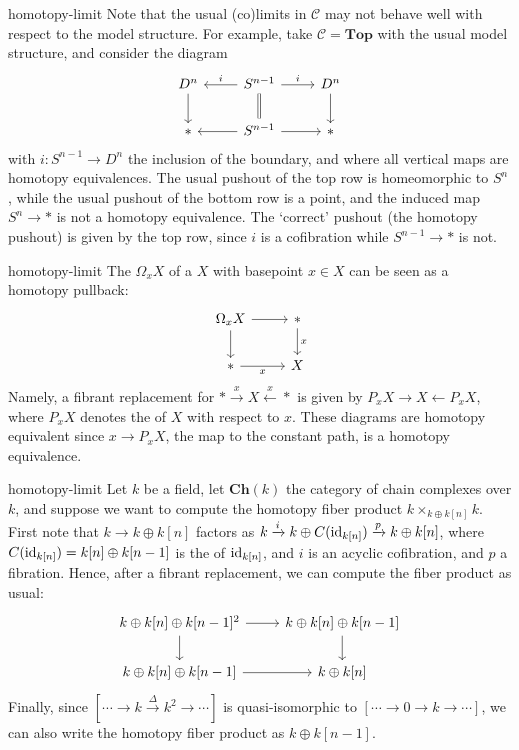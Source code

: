 \begin{example}{homotopy-limit}
    Note that the usual (co)limits in $\mathcal{C}$ may not behave well with respect to the model structure. For example, take $\mathcal{C} = \textbf{Top}$ with the usual model structure, and consider the diagram
    \[ \begin{tikzcd} D^n \arrow{d} & S^{n - 1} \arrow[swap]{l}{i} \arrow{r}{i} \arrow[equals]{d} & D^n \arrow{d} \\ * & S^{n - 1} \arrow{l} \arrow{r} & * \end{tikzcd} \]
    with $i : S^{n - 1} \to D^n$ the inclusion of the boundary, and where all vertical maps are homotopy equivalences. The usual pushout of the top row is homeomorphic to $S^n$, while the usual pushout of the bottom row is a point, and the induced map $S^n \to *$ is not a homotopy equivalence. The `correct' pushout (the homotopy pushout) is given by the top row, since $i$ is a cofibration while $S^{n - 1} \to *$ is not.
\end{example}

\begin{example}{homotopy-limit}
    The  $\Omega_x X$ of a  $X$ with basepoint $x \in X$ can be seen as a homotopy pullback:
    \[ \begin{tikzcd} \Omega_x X \arrow{d} \arrow{r} & * \arrow{d}{x} \\ * \arrow[swap]{r}{x} & X \end{tikzcd} \]
    Namely, a fibrant replacement for $* \xrightarrow{x} X \xleftarrow{x} *$ is given by $P_x X \rightarrow X \leftarrow P_x X$, where $P_x X$ denotes the  of $X$ with respect to $x$. These diagrams are homotopy equivalent since $x \to P_x X$, the map to the constant path, is a homotopy equivalence.
\end{example}

\begin{example}{homotopy-limit}
    Let $k$ be a field, let $\textbf{Ch}(k)$ the category of chain complexes over $k$, and suppose we want to compute the homotopy fiber product $k \times_{k \oplus k[n]} k$. First note that $k \to k \oplus k[n]$ factors as $k \xrightarrow{i} k \oplus C(\text{id}_{k[n]}) \xrightarrow{p} k \oplus k[n]$, where $C(\text{id}_{k[n]}) = k[n] \oplus k[n - 1]$ is the  of $\text{id}_{k[n]}$, and $i$ is an acyclic cofibration, and $p$ a fibration. Hence, after a fibrant replacement, we can compute the fiber product as usual:
    \[ \begin{tikzcd} k \oplus k[n] \oplus k[n - 1]^2 \arrow{d} \arrow{r} & k \oplus k[n] \oplus k[n - 1] \arrow{d} \\ k \oplus k[n] \oplus k[n - 1] \arrow{r} & k \oplus k[n] \end{tikzcd} \]
    Finally, since $[ \cdots \to k \xrightarrow{\Delta} k^2 \to \cdots ]$ is quasi-isomorphic to $[ \cdots \to 0 \to k \to \cdots ]$, we can also write the homotopy fiber product as $k \oplus k[n - 1]$.
\end{example}

